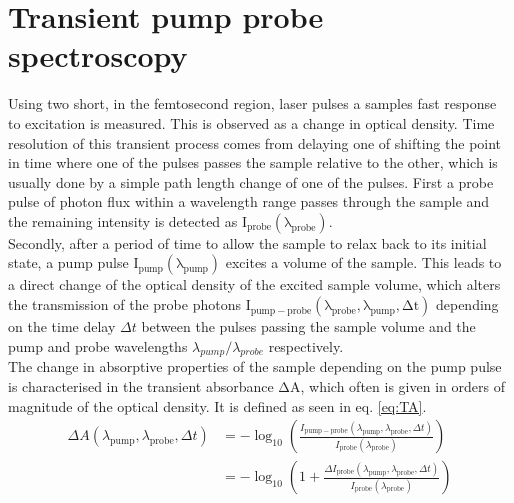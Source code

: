 \documentclass[twoside,openright]{scrreprt}
\begin{document}
\section{Transient pump probe spectroscopy}
Using two short, in the femtosecond region, laser pulses a samples fast response to excitation is measured. This is observed as a change in optical density. Time resolution of this transient process comes from delaying one of shifting the point in time where one of the pulses passes the sample relative to the other, which is usually done by a simple path length change of one of the pulses.\newline
First a probe pulse of photon flux within a wavelength range passes through the sample and the remaining intensity is detected as $\mathrm{I_{probe}(\lambda_{probe})}$. \\
Secondly, after a period of time to allow the sample to relax back to its initial state, a pump pulse $\mathrm{I_{pump}(\lambda_{pump})}$ excites a volume of the sample. This leads to a direct change of the optical density of the excited sample volume, which alters the transmission of the probe photons $\mathrm{I_{pump-probe}(\lambda_{probe}, \lambda_{pump}, \Delta t)}$ depending on the time delay $\Delta t$ between the pulses passing the sample volume and the pump and probe wavelengths $\lambda_{pump}/\lambda_{probe}$ respectively. \\
The change in absorptive properties of the sample depending on the pump pulse is characterised in the transient absorbance $\mathrm{\Delta A}$, which often is given in orders of magnitude of the optical density. It is defined as seen in eq. \ref{eq:TA}.
\begin{equation}\label{eq:TA}
\begin{split}
\Delta A(\lambda_{\mathrm{pump}}, \lambda_{\mathrm{probe}}, \Delta t)&=-\log _{10}\left(\frac{I_{\mathrm{pump}-\mathrm{probe}}\left(\lambda_{\mathrm{pump}}, \lambda_{\mathrm{probe}}, \Delta t\right)}{I_{\mathrm{probe}}\left(\lambda_{\mathrm{probe}}\right)}\right)\\
&=-\log _{10}\left(1+\frac{\Delta I_{\mathrm{probe}}\left(\lambda_{\mathrm{pump}}, \lambda_{\mathrm{probe}}, \Delta t\right)}{I_{\mathrm{probe}}\left(\lambda_{\mathrm{probe}}\right)}\right)
\end{split}
\end{equation}
\end{document}
